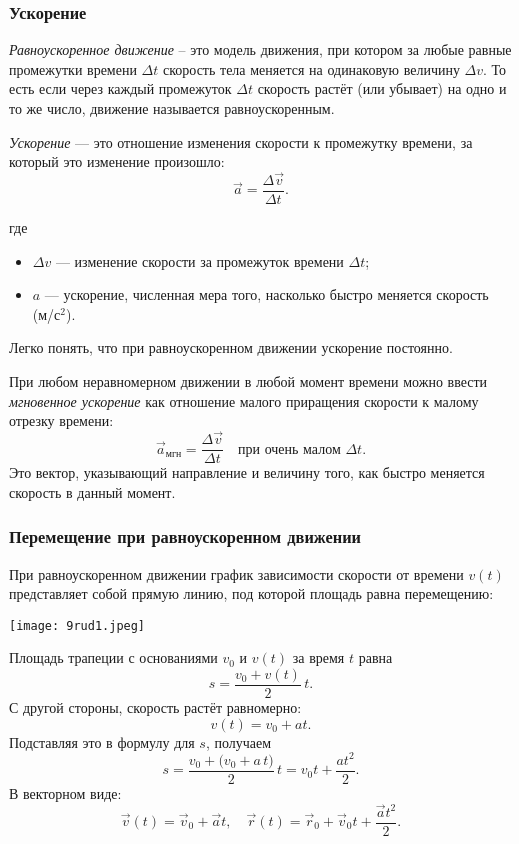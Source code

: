 \documentclass[12pt, a4paper]{article}%
\begin{document}
\subsubsection*{Ускорение}

\textit{Равноускоренное движение} – это модель движения, при котором за любые равные промежутки времени $\Delta t$ скорость тела
меняется на одинаковую величину $\Delta v$. То есть если через каждый промежуток $\Delta t$ скорость растёт (или убывает) на одно
и то же число, движение называется равноускоренным.



\textit{Ускорение} --- это отношение изменения скорости к промежутку времени, за который это изменение произошло:
\[
\vec a = \frac{\Delta\vec v}{\Delta t}.
\]

где
\begin{itemize}
  \item \(\Delta v\) --- изменение скорости за промежуток времени \(\Delta t\);
  \item \(a\) --- ускорение, численная мера того, насколько быстро меняется скорость (м/с$^2$).
\end{itemize}

Легко понять, что при равноускоренном движении ускорение постоянно.


При любом неравномерном движении в любой момент времени можно ввести \textit{мгновенное ускорение} как отношение малого приращения скорости к малому отрезку времени:
\[
\vec a_{\text{мгн}} = \frac{\Delta\vec v}{\Delta t}\quad\text{при очень малом }\Delta t.
\]
Это вектор, указывающий направление и величину того, как быстро меняется скорость в данный момент.


\subsubsection*{Перемещение при равноускоренном движении}

При равноускоренном движении график зависимости скорости от времени \(v(t)\) представляет собой прямую линию, под которой площадь
равна перемещению:


\begin{center}
\texttt{[image: 9rud1.jpeg]}
\label{fig:mpr}
\end{center}


Площадь трапеции с основаниями \(v_{0}\) и \(v(t)\) за время \(t\) равна
\[
s = \frac{v_{0} + v(t)}{2}\,t.
\]
С другой стороны, скорость растёт равномерно:
\[
v(t) = v_{0} + at.
\]
Подставляя это в формулу для \(s\), получаем
\[
s = \frac{v_{0} + \bigl(v_{0} + a\,t\bigr)}{2}\,t = v_{0}t + \frac{at^{2}}{2}.
\]
В векторном виде:
\[
\vec v(t) = \vec v_{0} + \vec at,\quad
\vec r(t) = \vec r_{0} + \vec v_{0}t + \frac{\vec at^{2}}{2}.
\]
\end{document}
